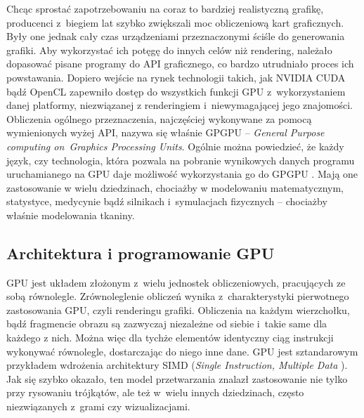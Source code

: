 		Chcąc sprostać zapotrzebowaniu na coraz to bardziej realistyczną grafikę, producenci z~biegiem lat szybko zwiększali moc obliczeniową kart graficznych. Były one jednak cały czas urządzeniami przeznaczonymi ściśle do generowania grafiki. Aby wykorzystać ich potęgę do innych celów niż rendering, należało dopasować pisane programy do API graficznego, co bardzo utrudniało proces ich powstawania. Dopiero wejście na rynek technologii takich, jak NVIDIA CUDA bądź OpenCL zapewniło dostęp do wszystkich funkcji GPU z~wykorzystaniem danej platformy, niezwiązanej z renderingiem i~niewymagającej jego znajomości. Obliczenia ogólnego przeznaczenia, najczęściej wykonywane za pomocą wymienionych wyżej API, nazywa się właśnie GPGPU -- \emph{General Purpose computing on~Graphics Processing Units}. Ogólnie można powiedzieć, że każdy język, czy technologia, która pozwala na pobranie wynikowych danych programu uruchamianego na GPU daje możliwość wykorzystania go do GPGPU \cite{gpu_wiki}. Mają one zastosowanie w wielu dziedzinach, chociażby w modelowaniu matematycznym, statystyce, medycynie bądź silnikach i~symulacjach fizycznych -- chociażby właśnie modelowania tkaniny. 
	
		\subsection{Architektura i programowanie GPU}
		\label{t:teoria:gpu:architektura}
		
		
		GPU jest układem złożonym z~wielu jednostek obliczeniowych, pracujących ze sobą równolegle. Zrównoleglenie obliczeń wynika z~charakterystyki pierwotnego zastosowania GPU, czyli renderingu grafiki. Obliczenia na każdym wierzchołku, bądź fragmencie obrazu są zazwyczaj niezależne od siebie i~takie same dla każdego z nich. Można więc dla tychże elementów identyczny ciąg instrukcji wykonywać równolegle, dostarczając do niego inne dane. GPU jest sztandarowym przykładem wdrożenia architektury SIMD (\emph{Single Instruction, Multiple Data} \cite{simd}). Jak się szybko okazało, ten model przetwarzania znalazł zastosowanie nie tylko przy rysowaniu trójkątów, ale też w~wielu innych dziedzinach, często niezwiązanych z~grami czy wizualizacjami.
		
